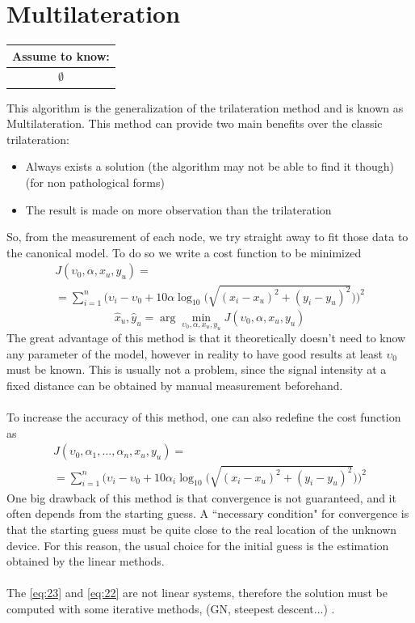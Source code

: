 \documentclass[12pt]{report}
\begin{document}
\section{Multilateration}
\begin{center}
    \begin{tabular}{ |c| } 
    \hline
    \multicolumn{1}{|c|}{ \textbf{Assume to know:} } \\
    \hline
    $\emptyset$\\
    \hline
    \end{tabular}
\end{center}
This algorithm is the generalization of the trilateration method and is known as Multilateration. 
This method can provide two main benefits over the classic trilateration:
\begin{itemize}
    \item Always exists a solution (the algorithm may not be able to find it though) (for non pathological forms)
    \item The result is made on more observation than the trilateration
\end{itemize}
So, from the measurement of each node, we try straight away to fit those data to the canonical model. To do so we write a cost function to be minimized
\begin{multline}
    J(\upsilon_0,\alpha,x_u,y_u)=\\=\sum_{i=1}^n\bigg(\upsilon_i-\upsilon_0+10\alpha\log_{10}\big(\sqrt{(x_i-x_u)^2+(y_i-y_u)^2}\big)\bigg)^2
    \label{eq:23}
\end{multline}
\begin{equation}
\hat{x}_u, \hat{y}_u=\arg \min_{\upsilon_0,\alpha,x_u,y_u}J(\upsilon_0,\alpha,x_u,y_u)
\end{equation}
The great advantage of this method is that it theoretically doesn't need to know any parameter of the model, however in reality to have good results at least $\upsilon_0$ must be known. This is usually not a problem, since the signal intensity at a fixed distance can be obtained by manual measurement beforehand.\\\\
To increase the accuracy of this method, one can also redefine the cost function as
\begin{multline}
    J(\upsilon_0,\alpha_1,...,\alpha_n,x_u,y_u)=\\=\sum_{i=1}^n\bigg(\upsilon_i-\upsilon_0+10\alpha_i\log_{10}\big(\sqrt{(x_i-x_u)^2+(y_i-y_u)^2}\big)\bigg)^2
    \label{eq:22}
\end{multline}
One big drawback of this method is that convergence is not guaranteed, and it often depends from the starting guess. A ``necessary condition" for convergence is that the starting guess must be quite close to the real location of the unknown device. For this reason, the usual choice for the initial guess is the estimation obtained by the linear methods.\\\\ 
The \eqref{eq:23} and \eqref{eq:22} are not linear systems, therefore the solution must be computed with some iterative methods, (GN, steepest descent...) \cite{chong2013introduction}.
\clearpage
\end{document}
